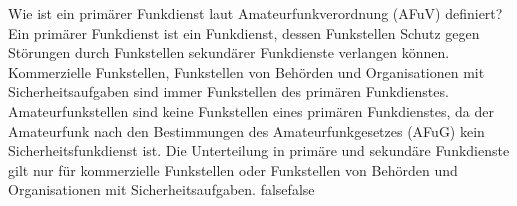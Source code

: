     {Wie ist ein primärer Funkdienst laut Amateurfunkverordnung (AFuV) definiert?}
    {Ein primärer Funkdienst ist ein Funkdienst, dessen Funkstellen Schutz gegen Störungen durch Funkstellen sekundärer Funkdienste verlangen können.}
    {Kommerzielle Funkstellen, Funkstellen von Behörden und Organisationen mit Sicherheitsaufgaben sind immer Funkstellen des primären Funkdienstes.}
    {Amateurfunkstellen sind keine Funkstellen eines primären Funkdienstes, da der Amateurfunk nach den Bestimmungen des Amateurfunkgesetzes (AFuG) kein Sicherheitsfunkdienst ist.}
    {Die Unterteilung in primäre und sekundäre Funkdienste gilt nur für kommerzielle Funkstellen oder Funkstellen von Behörden und  Organisationen mit Sicherheitsaufgaben.}
    {false}{false}